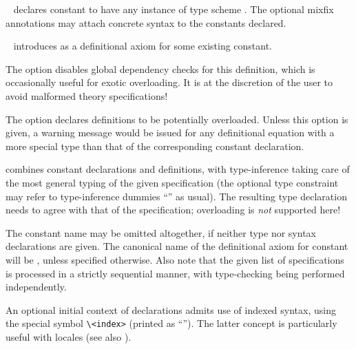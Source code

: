 \begin{isabellebody}
\begin{isamarkuptext}
\begin{description}
  \item \hyperlink{command.consts}{\mbox{}}~ declares constant  to have any instance of type scheme \isa{{\isasymsigma}}.  The optional
  mixfix annotations may attach concrete syntax to the constants
  declared.
  
  \item \hyperlink{command.defs}{\mbox{}}~ introduces 
  as a definitional axiom for some existing constant.
  
  The  option disables global dependency checks
  for this definition, which is occasionally useful for exotic
  overloading.  It is at the discretion of the user to avoid malformed
  theory specifications!
  
  The  option declares definitions to be
  potentially overloaded.  Unless this option is given, a warning
  message would be issued for any definitional equation with a more
  special type than that of the corresponding constant declaration.
  
  \item \hyperlink{command.constdefs}{\mbox{}} combines constant declarations and
  definitions, with type-inference taking care of the most general
  typing of the given specification (the optional type constraint may
  refer to type-inference dummies ``\isa{{\isacharunderscore}}'' as usual).  The
  resulting type declaration needs to agree with that of the
  specification; overloading is \emph{not} supported here!
  
  The constant name may be omitted altogether, if neither type nor
  syntax declarations are given.  The canonical name of the
  definitional axiom for constant  will be ,
  unless specified otherwise.  Also note that the given list of
  specifications is processed in a strictly sequential manner, with
  type-checking being performed independently.
  
  An optional initial context of  declarations
  admits use of indexed syntax, using the special symbol \verb|\<index>| (printed as ``\isa{{\isachardoublequote}{\isasymindex}{\isachardoublequote}}'').  The latter concept is
  particularly useful with locales (see also ).


\end{description}
\end{isamarkuptext}
\end{isabellebody}
